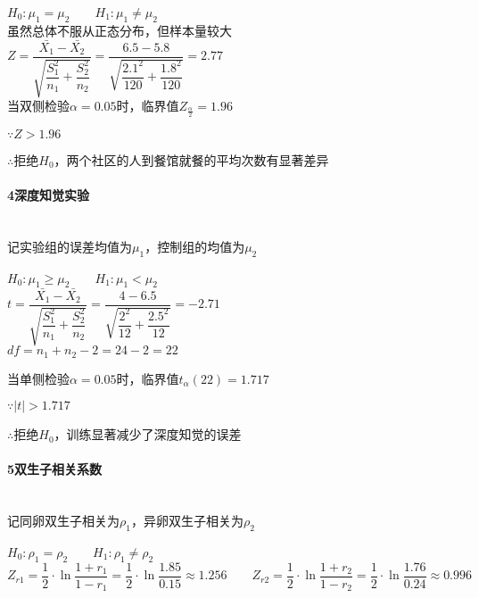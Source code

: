 \documentclass[UTF8]{ctexart}
\begin{document}
$H_0:\mu_1=\mu_2 \qquad H_1:\mu_1\ne\mu_2$
~\\

虽然总体不服从正态分布，但样本量较大
~\\

$Z=\dfrac{\bar{X_1}-\bar{X_2}}{\sqrt{\dfrac{S_1^2}{n_1}+\dfrac{S_2^2}{n_2}}}=\dfrac{6.5-5.8}{\sqrt{\dfrac{2.1^2}{120}+\dfrac{1.8^2}{120}}}=2.77$
~\\

当双侧检验$\alpha=0.05$时，临界值$Z_{\frac{\alpha}{2}}=1.96$

$\because Z > 1.96$

$\therefore$拒绝$H_0$，两个社区的人到餐馆就餐的平均次数有显著差异

\paragraph{4深度知觉实验}
~\\

记实验组的误差均值为$\mu_1$，控制组的均值为$\mu_2$

$H_0:\mu_1\ge\mu_2 \qquad H_1:\mu_1<\mu_2$
~\\

$t=\dfrac{\bar{X_1}-\bar{X_2}}{\sqrt{\dfrac{S_1^2}{n_1}+\dfrac{S_2^2}{n_2}}}=\dfrac{4-6.5}{\sqrt{\dfrac{2^2}{12}+\dfrac{2.5^2}{12}}}=-2.71$
~\\

$df=n_1+n_2-2=24-2=22$

当单侧检验$\alpha=0.05$时，临界值$t_{\alpha}(22)=1.717$

$\because |t| > 1.717$

$\therefore$拒绝$H_0$，训练显著减少了深度知觉的误差

\paragraph{5双生子相关系数}
~\\

记同卵双生子相关为$\rho_1$，异卵双生子相关为$\rho_2$

$H_0:\rho_1=\rho_2 \qquad H_1:\rho_1\ne\rho_2$
~\\

$Z_{r1}=\dfrac{1}{2}\cdot\ln\dfrac{1+r_1}{1-r_1}=\dfrac{1}{2}\cdot\ln\dfrac{1.85}{0.15}\approx1.256 \qquad Z_{r2}=\dfrac{1}{2}\cdot\ln\dfrac{1+r_2}{1-r_2}=\dfrac{1}{2}\cdot\ln\dfrac{1.76}{0.24}\approx0.996$
~\\

\end{document}
